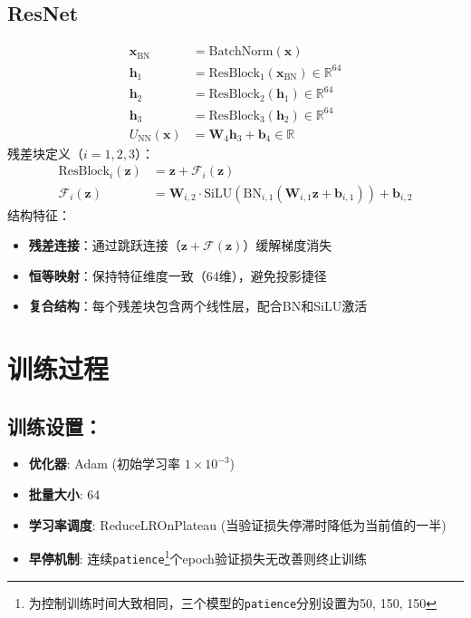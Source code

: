 \documentclass[11pt]{article}
\begin{document}
\subsection{ResNet}
\begin{align*}
    \mathbf{x}_{\text{BN}}    & = \text{BatchNorm}(\mathbf{x})                                  \\
    \mathbf{h}_1              & = \text{ResBlock}_1(\mathbf{x}_{\text{BN}}) \in \mathbb{R}^{64} \\
    \mathbf{h}_2              & = \text{ResBlock}_2(\mathbf{h}_1) \in \mathbb{R}^{64}           \\
    \mathbf{h}_3              & = \text{ResBlock}_3(\mathbf{h}_2) \in \mathbb{R}^{64}           \\
    U_{\text{NN}}(\mathbf{x}) & = \mathbf{W}_4 \mathbf{h}_3 + \mathbf{b}_4 \in \mathbb{R}
\end{align*}
残差块定义（$i=1,2,3$）：
\begin{align*}
    \text{ResBlock}_i(\mathbf{z}) & = \mathbf{z} + \mathcal{F}_i(\mathbf{z})                                                                                \\
    \mathcal{F}_i(\mathbf{z})     & = \mathbf{W}_{i,2} \cdot \text{SiLU}(\text{BN}_{i,1}(\mathbf{W}_{i,1}\mathbf{z} + \mathbf{b}_{i,1})) + \mathbf{b}_{i,2}
\end{align*}
结构特征：
\begin{itemize}[leftmargin=2em]
    \item \textbf{残差连接}：通过跳跃连接（$\mathbf{z} + \mathcal{F}(\mathbf{z})$）缓解梯度消失
    \item \textbf{恒等映射}：保持特征维度一致（64维），避免投影捷径
    \item \textbf{复合结构}：每个残差块包含两个线性层，配合BN和SiLU激活
\end{itemize}

\newpage

\section{训练过程}

\subsection{训练设置：}
\begin{itemize}[leftmargin=2em]
    \item \textbf{优化器}: Adam (初始学习率 $1\times10^{-3}$)
    \item \textbf{批量大小}: 64
    \item \textbf{学习率调度}: ReduceLROnPlateau (当验证损失停滞时降低为当前值的一半)
    \item \textbf{早停机制}: 连续\texttt{patience}\footnote{为控制训练时间大致相同，三个模型的\texttt{patience}分别设置为50, 150, 150}个epoch验证损失无改善则终止训练

\end{itemize}
\end{document}
